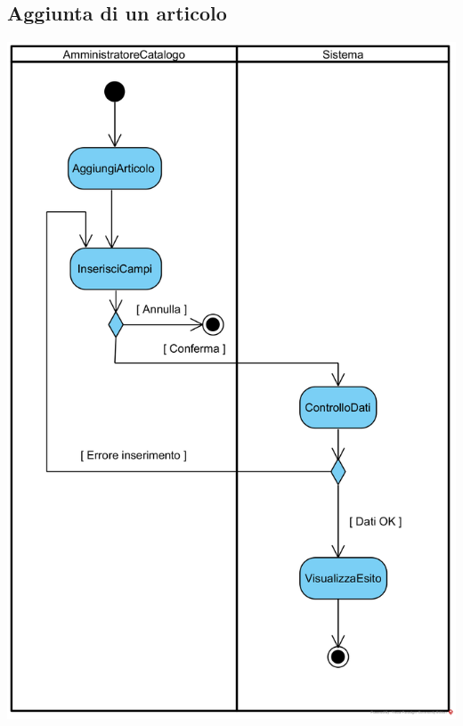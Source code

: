 \documentclass[12pt]{article}
\begin{document}
\subsection{Aggiunta di un articolo}
\begin{center}
\includegraphics[width=\textwidth]{ActivityDiagram/AmministratoreCatalogoInserisceNuovoArticolo}
\end{center}
\end{document}
